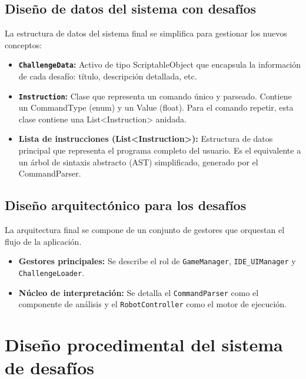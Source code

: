 \subsection{Diseño de datos del sistema con desafíos }
La estructura de datos del sistema final se simplifica para gestionar los nuevos conceptos:

\begin{itemize}
	\item \textbf{\texttt{ChallengeData}:} Activo de tipo ScriptableObject que encapsula la información de cada desafío: título, descripción detallada, etc.
	\item \textbf{\texttt{Instruction}:} Clase que representa un comando único y parseado. Contiene un CommandType (enum) y un Value (float). Para el comando repetir, esta clase contiene una List<Instruction> anidada.
	\item \textbf{Lista de instrucciones (List<Instruction>):} Estructura de datos principal que representa el programa completo del usuario. Es el equivalente a un árbol de sintaxis abstracto (AST) simplificado, generado por el CommandParser.
\end{itemize}

\subsection{Diseño arquitectónico para los desafíos}
La arquitectura final se compone de un conjunto de gestores que orquestan el flujo de la aplicación.

\begin{itemize}
	\item \textbf{Gestores principales:} Se describe el rol de \texttt{GameManager}, \texttt{IDE\_UIManager} y \texttt{ChallengeLoader}.
	\item \textbf{Núcleo de interpretación:} Se detalla el \texttt{CommandParser} como el componente de análisis y el \texttt{RobotController} como el motor de ejecución.
\end{itemize}

\section{Diseño procedimental del sistema de desafíos}

